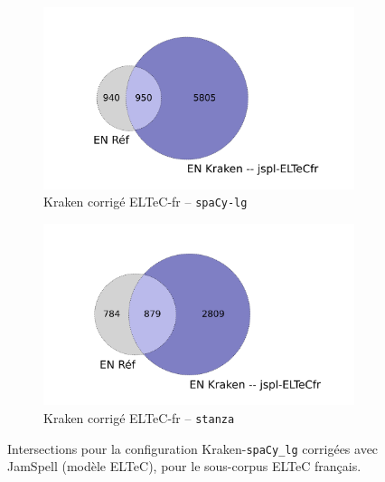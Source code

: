\begin{figure}[h!]
\begin{minipage}{7cm}
\begin{subfigure}{1\textwidth}
  \includegraphics[width=1\textwidth]{IMAGES/INTERSECTIONS_GLOBALES/ELTeCFRA_Kraken -- jspl-ELTeCfr_spacy-lg-concat_intersection.png} 
  \caption{Kraken corrigé ELTeC-fr -- \texttt{spaCy-lg}}
  \label{fig:ELTeCFRA_Kraken -- jspl-ELTeCfr_spacy-lg-concat_intersection}
  \end{subfigure}
  \end{minipage}
  \begin{minipage}{7cm}
  \begin{subfigure}{1\textwidth}
  \includegraphics[width=1\textwidth]{IMAGES/INTERSECTIONS_GLOBALES/ELTeCFRA_Kraken -- jspl-ELTeCfr_stanza-concat_intersection.png}
  \caption{Kraken corrigé ELTeC-fr -- \texttt{stanza}}
  \label{fig:ELTeCFRA_Kraken -- jspl-ELTeCFR_stanza-concat_intersection}
  \end{subfigure}
    \end{minipage}
\caption{Intersections pour la configuration Kraken-\texttt{spaCy\_lg} corrigées avec JamSpell (modèle ELTeC), pour le sous-corpus ELTeC français.}
\label{fig:intersection_globale-kraken}
\end{figure}

